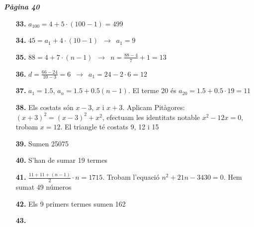 \documentclass[a4paper, pdf, twoside]{book}
\begin{document}
\begin{multicols}{2}

{\textbf{\em Pàgina 40}} \hrulefill
\begin{enumerate}
\vspace{0.25cm}
\item[\fontfamily{phv}\selectfont\color{blue}\textbf{33. }] 
$a_{100}=4+5\cdot (100-1)=499$
 \end{enumerate}
\begin{enumerate}
\vspace{0.25cm}
\item[\fontfamily{phv}\selectfont\color{blue}\textbf{34. }] 
$45=a_1+4\cdot (10-1)$ $\,\rightarrow \,$ $a_1=9$
\vspace{0.25cm}
\item[\fontfamily{phv}\selectfont\color{blue}\textbf{35. }] 
$88=4+7\cdot (n-1)$ $\,\rightarrow \,$ $n=\frac {88-4}{7}+1=13$
\vspace{0.25cm}
\item[\fontfamily{phv}\selectfont\color{blue}\textbf{36. }] 
$d=\frac {66-24}{10-3}=6$ $\,\rightarrow \,$ $a_1=24-2\cdot 6=12$
\vspace{0.25cm}
\item[\fontfamily{phv}\selectfont\color{blue}\textbf{37. }] 
$a_1=1.5$, $a_n=1.5+0.5 (n-1)$. El terme 20 és $a_{20}=1.5+ 0.5 \cdot 19 = 11$
\vspace{0.25cm}
\item[\fontfamily{phv}\selectfont\color{blue}\textbf{38. }] 
Els costats són $x-3$, $x$ i $x+3$. Aplicam Pitàgores: $(x+3)^2=(x-3)^2+x^2$, efectuam les identitats notable $x^2-12x=0$, trobam $x=12$. El triangle té costats 9, 12 i 15
\vspace{0.25cm}
\item[\fontfamily{phv}\selectfont\color{blue}\textbf{39. }] 
Sumen 25075
\vspace{0.25cm}
\item[\fontfamily{phv}\selectfont\color{blue}\textbf{40. }] 
S'han de sumar 19 termes
\vspace{0.25cm}
\item[\fontfamily{phv}\selectfont\color{blue}\textbf{41. }] 
$\frac {11+11+(n-1)}{2}\cdot n = 1715$. Trobam l'equació $n^2+21n-3430=0$. Hem sumat 49 números
\vspace{0.25cm}
\item[\fontfamily{phv}\selectfont\color{blue}\textbf{42. }] 
Els 9 primers termes sumen 162
\vspace{0.25cm}
\item[\fontfamily{phv}\selectfont\color{blue}\textbf{43. }] 

\end{enumerate}
\end{multicols}
\end{document}
